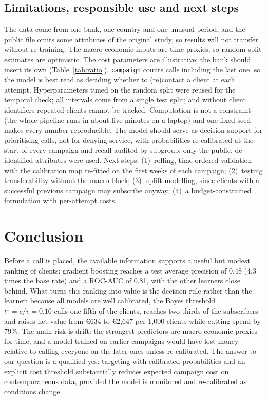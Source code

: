 \documentclass[conference]{IEEEtran}
\begin{document}
\subsection{Limitations, responsible use and next steps}
The data come from one bank, one country and one unusual period, and the public file omits some attributes of the original study, so results will not transfer without re-training. The macro-economic inputs are time proxies, so random-split estimates are optimistic. The cost parameters are illustrative; the bank should insert its own (Table~\ref{tab:ratio}). \texttt{campaign} counts calls including the last one, so the model is best read as deciding whether to (re)contact a client at each attempt. Hyperparameters tuned on the random split were reused for the temporal check; all intervals come from a single test split; and without client identifiers repeated clients cannot be tracked. Computation is not a constraint (the whole pipeline runs in about five minutes on a laptop) and one fixed seed makes every number reproducible. The model should serve as decision support for prioritising calls, not for denying service, with probabilities re-calibrated at the start of every campaign and recall audited by subgroup; only the public, de-identified attributes were used. Next steps: (1)~rolling, time-ordered validation with the calibration map re-fitted on the first weeks of each campaign; (2)~testing transferability without the macro block; (3)~uplift modelling, since clients with a successful previous campaign may subscribe anyway; (4)~a budget-constrained formulation with per-attempt costs.

\section{Conclusion}
Before a call is placed, the available information supports a useful but modest ranking of clients: gradient boosting reaches a test average precision of 0.48 (4.3 times the base rate) and a ROC-AUC of 0.81, with the other learners close behind. What turns this ranking into value is the decision rule rather than the learner: because all models are well calibrated, the Bayes threshold $t^\star=c/v=0.10$ calls one fifth of the clients, reaches two thirds of the subscribers and raises net value from \euro634 to \euro2,647 per 1,000 clients while cutting spend by 79\%. The main risk is drift: the strongest predictors are macro-economic proxies for time, and a model trained on earlier campaigns would have lost money relative to calling everyone on the later ones unless re-calibrated. The answer to our question is a qualified yes: targeting with calibrated probabilities and an explicit cost threshold substantially reduces expected campaign cost on contemporaneous data, provided the model is monitored and re-calibrated as conditions change.
\end{document}
